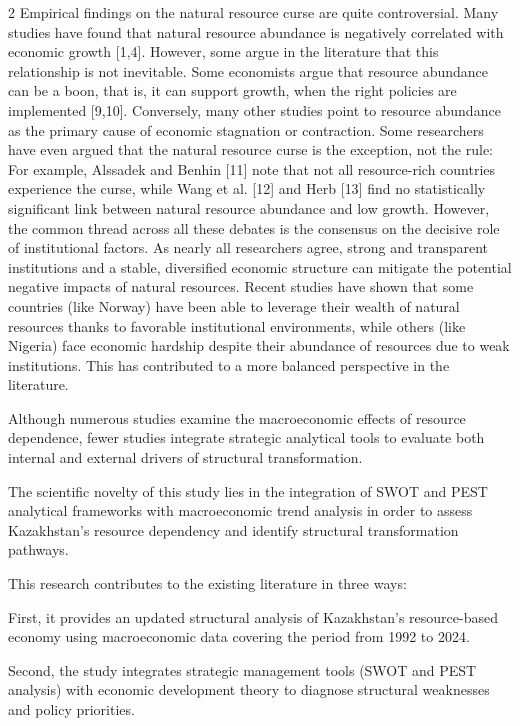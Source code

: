 \begin{multicols}{2}
Empirical findings on the natural resource curse are quite
controversial. Many studies have found that natural resource abundance
is negatively correlated with economic growth {[}1,4{]}. However, some
argue in the literature that this relationship is not inevitable. Some
economists argue that resource abundance can be a boon, that is, it can
support growth, when the right policies are implemented {[}9,10{]}.
Conversely, many other studies point to resource abundance as the
primary cause of economic stagnation or contraction. Some researchers
have even argued that the natural resource curse is the exception, not
the rule: For example, Alssadek and Benhin {[}11{]} note that not all
resource-rich countries experience the curse, while Wang et al. {[}12{]}
and Herb {[}13{]} find no statistically significant link between natural
resource abundance and low growth. However, the common thread across all
these debates is the consensus on the decisive role of institutional
factors. As nearly all researchers agree, strong and transparent
institutions and a stable, diversified economic structure can mitigate
the potential negative impacts of natural resources. Recent studies have
shown that some countries (like Norway) have been able to leverage their
wealth of natural resources thanks to favorable institutional
environments, while others (like Nigeria) face economic hardship despite
their abundance of resources due to weak institutions. This has
contributed to a more balanced perspective in the literature.

Although numerous studies examine the macroeconomic effects of resource
dependence, fewer studies integrate strategic analytical tools to
evaluate both internal and external drivers of structural
transformation.

The scientific novelty of this study lies in the integration of SWOT and
PEST analytical frameworks with macroeconomic trend analysis in order to
assess Kazakhstan's resource dependency and identify structural
transformation pathways.

This research contributes to the existing literature in three ways:

First, it provides an updated structural analysis of Kazakhstan's
resource-based economy using macroeconomic data covering the period from
1992 to 2024.

Second, the study integrates strategic management tools (SWOT and PEST
analysis) with economic development theory to diagnose structural
weaknesses and policy priorities.


\end{multicols}
